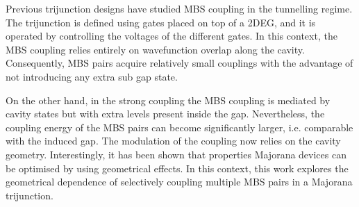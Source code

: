 Previous trijunction designs\cite{Hell2017} have studied MBS coupling in the tunnelling regime.
The trijunction is defined using gates placed on top of a 2DEG, and it is operated by controlling the voltages of the different gates.
In this context, the MBS coupling relies entirely on wavefunction overlap along the cavity. 
Consequently, MBS pairs acquire relatively small couplings with the advantage of not introducing any extra sub gap state.

On the other hand, in the strong coupling the MBS coupling is mediated by cavity states but with extra levels present inside the gap.
Nevertheless, the coupling energy of the MBS pairs can become significantly larger, i.e. comparable with the induced gap.
The modulation of the coupling now relies on the cavity geometry.
Interestingly, it has been shown that properties Majorana devices can be optimised by using geometrical effects.
In this context, this work explores the geometrical dependence of selectively coupling multiple MBS pairs in a Majorana trijunction.






